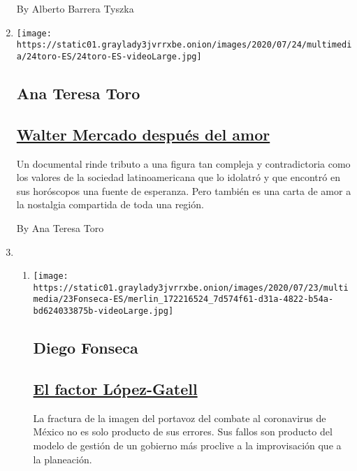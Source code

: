 \begin{enumerate}
  By Alberto Barrera Tyszka
\item
  \texttt{[image: https://static01.graylady3jvrrxbe.onion/images/2020/07/24/multimedia/24toro-ES/24toro-ES-videoLarge.jpg]}

  \hypertarget{ana-teresa-toro}{%
  \subsection{Ana Teresa Toro}\label{ana-teresa-toro}}

  \hypertarget{walter-mercado-despuuxe9s-del-amor}{%
  \subsection{\texorpdfstring{\href{/es/2020/07/24/espanol/opinion/walter-mercado-amor-netflix.html}{Walter
  Mercado después del
  amor}}{Walter Mercado después del amor}}\label{walter-mercado-despuuxe9s-del-amor}}

  Un documental rinde tributo a una figura tan compleja y contradictoria
  como los valores de la sociedad latinoamericana que lo idolatró y que
  encontró en sus horóscopos una fuente de esperanza. Pero también es
  una carta de amor a la nostalgia compartida de toda una región.

  By Ana Teresa Toro
\item
  \begin{enumerate}
  \def\labelenumii{\arabic{enumii}.}
  \item
    \texttt{[image: https://static01.graylady3jvrrxbe.onion/images/2020/07/23/multimedia/23Fonseca-ES/merlin\_172216524\_7d574f61-d31a-4822-b54a-bd624033875b-videoLarge.jpg]}

    \hypertarget{diego-fonseca}{%
    \subsection{Diego Fonseca}\label{diego-fonseca}}

    \hypertarget{el-factor-luxf3pez-gatell}{%
    \subsection{\texorpdfstring{\href{/es/2020/07/23/espanol/opinion/lopez-gatell.html}{El
    factor
    López-Gatell}}{El factor López-Gatell}}\label{el-factor-luxf3pez-gatell}}

    La fractura de la imagen del portavoz del combate al coronavirus de
    México no es solo producto de sus errores. Sus fallos son producto
    del modelo de gestión de un gobierno más proclive a la improvisación
    que a la planeación.


\end{enumerate}
\end{enumerate}
